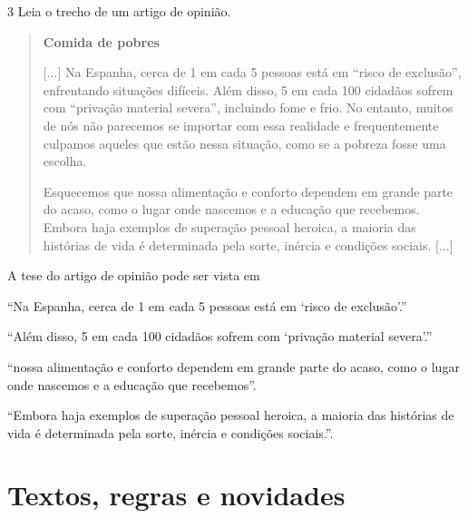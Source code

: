 \num{3} Leia o trecho de um artigo de opinião.

\begin{quote}
\textbf{Comida de pobres}


{[}...{]} Na Espanha, cerca de 1 em cada 5 pessoas está em ``risco de
exclusão'', enfrentando situações difíceis. Além disso, 5 em cada 100
cidadãos sofrem com ``privação material severa'', incluindo fome e frio.
No entanto, muitos de nós não parecemos se importar com essa realidade e
frequentemente culpamos aqueles que estão nessa situação, como se a
pobreza fosse uma escolha.

Esquecemos que nossa alimentação e conforto dependem em grande parte do
acaso, como o lugar onde nascemos e a educação que recebemos. Embora
haja exemplos de superação pessoal heroica, a maioria das histórias de
vida é determinada pela sorte, inércia e condições sociais. {[}...{]}

\end{quote}

A tese do artigo de opinião pode ser vista em

\begin{escolha}
\item ``Na Espanha, cerca de 1 em cada 5 pessoas está em `risco de
exclusão'.''

\item ``Além disso, 5 em cada 100 cidadãos sofrem com `privação material
severa'.''

\item ``nossa alimentação e conforto dependem em grande parte do acaso,
como o lugar onde nascemos e a educação que recebemos''.

\item ``Embora haja exemplos de superação pessoal heroica, a maioria das
histórias de vida é determinada pela sorte, inércia e condições
sociais.''.
\end{escolha}

\chapter{Textos, regras e novidades}

